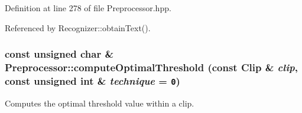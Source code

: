 Definition at line 278 of file Preprocessor.hpp.

Referenced by Recognizer::obtainText().\hypertarget{class_preprocessor_aaeb94a3b52b835bc26efebb40be25bc}{
\subsubsection[computeOptimalThreshold]{\setlength{\rightskip}{0pt plus 5cm}const unsigned char \& Preprocessor::computeOptimalThreshold (const {\bf Clip} \& {\em clip}, \/  const unsigned int \& {\em technique} = {\tt 0})}}
\label{class_preprocessor_aaeb94a3b52b835bc26efebb40be25bc}


Computes the optimal threshold value within a clip. 

